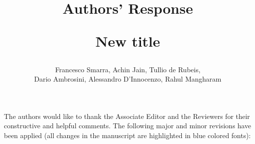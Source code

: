 \documentclass{article}
\begin{document}
\title{Authors' Response \\
\begin{Large}
	New title
\end{Large}
}

\author{Francesco Smarra, Achin Jain, Tullio de Rubeis, \\ Dario Ambrosini, Alessandro D’Innocenzo, Rahul Mangharam}



\date{}

\maketitle



\bigskip



The authors would like to thank the Associate Editor and the Reviewers for their constructive and helpful comments. The following major and minor revisions have been applied (all changes in the manuscript are highlighted in \textcolor[rgb]{0.00,0.00,1.00}{blue colored fonts}):
\end{document}
